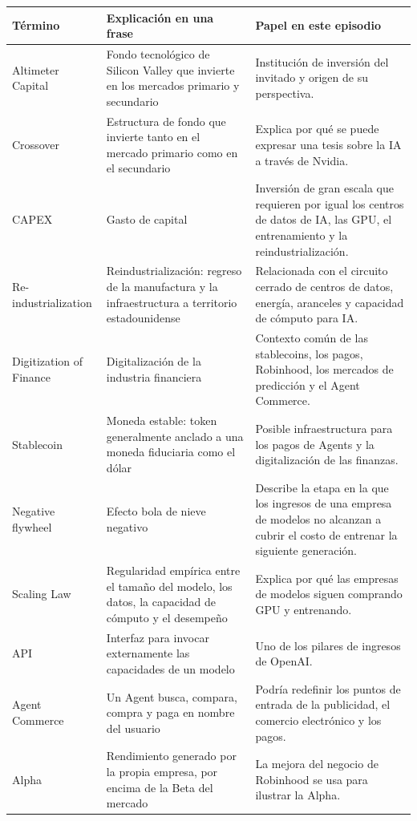 \documentclass[a4paper]{article}
\begin{document}
\begin{longtable}{p{}p{}p{}}
\toprule
Término & Explicación en una frase & Papel en este episodio \\
\midrule
Altimeter Capital & Fondo tecnológico de Silicon Valley que invierte en los mercados primario y secundario & Institución de inversión del invitado y origen de su perspectiva. \\
Crossover & Estructura de fondo que invierte tanto en el mercado primario como en el secundario & Explica por qué se puede expresar una tesis sobre la IA a través de Nvidia. \\
CAPEX & Gasto de capital & Inversión de gran escala que requieren por igual los centros de datos de IA, las GPU, el entrenamiento y la reindustrialización. \\
Re-industrialization & Reindustrialización: regreso de la manufactura y la infraestructura a territorio estadounidense & Relacionada con el circuito cerrado de centros de datos, energía, aranceles y capacidad de cómputo para IA. \\
Digitization of Finance & Digitalización de la industria financiera & Contexto común de las stablecoins, los pagos, Robinhood, los mercados de predicción y el Agent Commerce. \\
Stablecoin & Moneda estable: token generalmente anclado a una moneda fiduciaria como el dólar & Posible infraestructura para los pagos de Agents y la digitalización de las finanzas. \\
Negative flywheel & Efecto bola de nieve negativo & Describe la etapa en la que los ingresos de una empresa de modelos no alcanzan a cubrir el costo de entrenar la siguiente generación. \\
Scaling Law & Regularidad empírica entre el tamaño del modelo, los datos, la capacidad de cómputo y el desempeño & Explica por qué las empresas de modelos siguen comprando GPU y entrenando. \\
API & Interfaz para invocar externamente las capacidades de un modelo & Uno de los pilares de ingresos de OpenAI. \\
Agent Commerce & Un Agent busca, compara, compra y paga en nombre del usuario & Podría redefinir los puntos de entrada de la publicidad, el comercio electrónico y los pagos. \\
Alpha & Rendimiento generado por la propia empresa, por encima de la Beta del mercado & La mejora del negocio de Robinhood se usa para ilustrar la Alpha. \\

\end{longtable}
\end{document}
